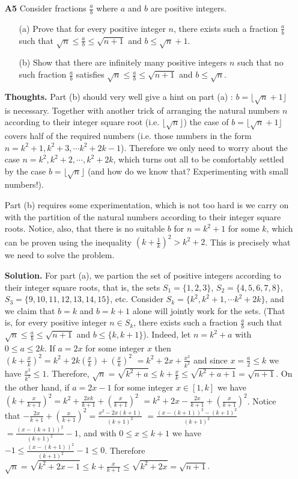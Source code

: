 \documentclass[11pt,a4paper]{article}
\begin{document}
\begin{itemize}
\newpage
\item[\textbf{A5}]
Consider fractions $\frac{a}{b}$ where $a$ and $b$ are positive integers.
\begin{itemize}
\item[(a)]
Prove that for every positive integer $n$, there exists such a fraction $\frac{a}{b}$ such that $\sqrt{n} \le \frac{a}{b} \le \sqrt{n+1}$ and $b \le \sqrt{n}+1$.
\item[(b)]
Show that there are infinitely many positive integers $n$ such that no such fraction $\frac{a}{b}$ satisfies $\sqrt{n} \le \frac{a}{b} \le \sqrt{n+1}$ and $b \le \sqrt{n}$. 
\end{itemize}

\textbf{Thoughts.} 
Part (b) should very well give a hint on part (a) : $b=\lfloor\sqrt{n}+1\rfloor$ is necessary. 
Together with another trick of arranging the natural numbers $n$ according to their integer square root 
(i.e. $\lfloor\sqrt{n}\rfloor$) the case of $b=\lfloor\sqrt{n}+1\rfloor$ covers half of the required numbers 
(i.e. those numbers in the form $n=k^2+1, k^2+3, \cdots k^2+2k-1$). 
Therefore we only need to worry about the case $n=k^2, k^2+2, \cdots , k^2+2k$, 
which turns out all to be comfortably settled by the case $b=\lfloor\sqrt{n}\rfloor$
(and how do we know that? Experimenting with small numbers!). 

Part (b) requires some experimentation, which is not too hard is we carry on with the partition of the natural numbers according to their integer square roots. 
Notice, also, that there is no suitable $b$ for $n=k^2+1$ for some $k$, which can be proven using the inequality 
$(k+\frac 1k)^2>k^2+2$. This is precisely what we need to solve the problem. 

\textbf{Solution.} 
For part (a), we partion the set of positive integers according to their integer square roots, 
that is, the sets $S_1=\{1,2,3\}$, $S_2=\{4,5,6,7,8\}$, $S_3=\{9,10,11,12,13,14,15\}$, etc. 
Consider $S_k=\{k^2, k^2+1, \cdots k^2+2k\}$, 
and we claim that $b=k$ and $b=k+1$ alone will jointly work for the sets. 
(That is, for every positive integer $n\in S_k$, there exists such a fraction $\frac{a}{b}$ such that $\sqrt{n} \le \frac{a}{b} \le \sqrt{n+1}$ and $b \le \{k, k+1\}$). 
Indeed, let $n=k^2+a$ with $0\le a\le 2k$. 
If $a=2x$ for some integer $x$ then 
$(k+\frac xk)^2=k^2+ 2k\left(\frac xk\right)+\left(\frac xk\right)^2$
$=k^2+2x+\frac{x^2}{k^2}$
and since $x=\frac a2\le k$ we have $\frac{x^2}{k^2}\le 1$. 
Therefore, 
$\sqrt{n}=\sqrt{k^2+a}\le k+\frac xk\le\sqrt{k^2+a+1}=\sqrt{n+1}$. 
On the other hand, if $a=2x-1$ for some integer $x\in [1, k]$ we have 
$(k+\frac x{k+1})^2=k^2+\frac{2xk}{k+1}+(\frac x{k+1})^2$
$=k^2+2x-\frac{2x}{k+1}+(\frac x{k+1})^2$. 
Notice that $-\frac{2x}{k+1}+(\frac x{k+1})^2=\frac{x^2-2x(k+1)}{(k+1)^2}$
$=\frac{(x-(k+1))^2-(k+1)^2}{(k+1)^2}$
$=\frac{(x-(k+1))^2}{(k+1)^2}-1$, 
and with $0\le x\le k+1$ we have 
$-1\le \frac{(x-(k+1))^2}{(k+1)^2}-1\le 0$. 
Therefore 
$\sqrt{n}=\sqrt{k^2+2x-1}\le k+\frac x{k+1}\le \sqrt{k^2+2x}=\sqrt{n+1}$. 


\end{itemize}
\end{document}
